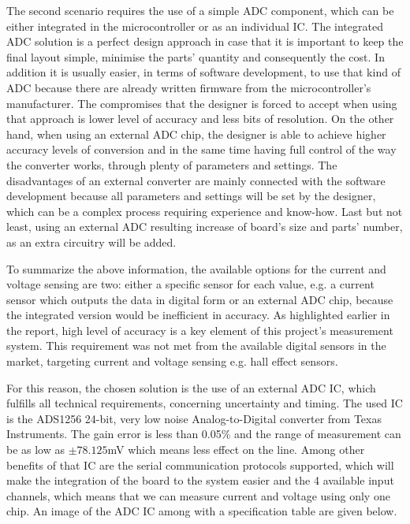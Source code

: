 The second scenario requires the use of a simple ADC component, which can be either integrated in the microcontroller or as an individual IC. The integrated ADC solution is a perfect design approach in case that it is important to keep the final layout simple, minimise the parts' quantity and consequently the cost. In addition it is usually easier, in terms of software development, to use that kind of ADC because there are already written firmware from the microcontroller's manufacturer. The compromises that the designer is forced to accept when using that approach is lower level of accuracy and less bits of resolution. On the other hand, when using an external ADC chip, the designer is able to achieve higher accuracy levels of conversion and in the same time having full control of  the way the converter works, through plenty of parameters and settings. The disadvantages of an external converter are mainly connected with the software development because all parameters and settings will be set by the designer, which can be a complex process requiring experience and know-how. Last but not least, using an external ADC resulting increase of board's size and parts' number, as an extra circuitry will be added.

To summarize the above information, the available options for the current and voltage sensing are two: either a specific sensor for each value, e.g. a current sensor which outputs the data in digital form or an external ADC chip, because the integrated version would be inefficient in accuracy. As highlighted earlier in the report, high level of accuracy is a key element of this project's measurement system. This requirement was not met from the available digital sensors in the market, targeting current and voltage sensing e.g. hall effect sensors.

For this reason, the chosen solution is the use of an external ADC IC, which fulfills all technical requirements, concerning uncertainty and timing. The used IC is the ADS1256 24-bit, very low noise Analog-to-Digital converter from Texas Instruments. The gain error is less than 0.05\% and the range of measurement can be as low as $\pm 78.125$mV which means less effect on the line. Among other benefits of that IC are the serial communication protocols supported, which will make the integration of the board to the system easier and the 4 available input channels, which means that we can measure current and voltage using only one chip. An image of the ADC IC among with a specification table are given below.\\

